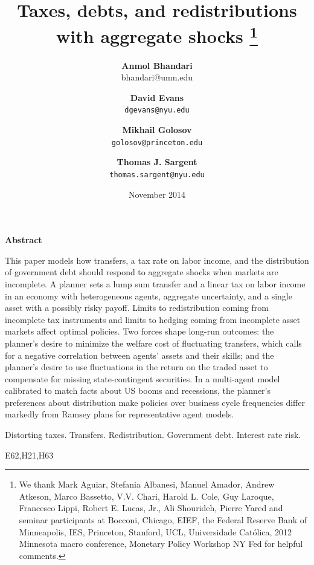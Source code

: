 \documentclass[thmsb,11pt]{article}
\begin{document}
\author{\textbf{Anmol Bhandari}\\bhandari@umn.edu \and \textbf{David Evans} \\ \texttt{dgevans@nyu.edu} \and \textbf{Mikhail Golosov}\\\texttt{golosov@princeton.edu} \and \textbf{Thomas J. Sargent} \\ \texttt{thomas.sargent@nyu.edu}
}
\title{\textbf{Taxes, debts,  and redistributions with aggregate shocks%
\thanks{%
We thank Mark Aguiar, Stefania Albanesi, Manuel Amador,  Andrew Atkeson, Marco Bassetto, V.V. Chari, Harold
L. Cole, Guy Laroque, Francesco Lippi, Robert E. Lucas, Jr., Ali Shourideh, Pierre Yared and seminar
participants at Bocconi, Chicago, EIEF, the Federal Reserve Bank of
Minneapolis, IES, Princeton, Stanford, UCL, Universidade Cat\'{o}lica, 2012
Minnesota macro conference, Monetary Policy Workshop NY Fed for helpful
comments.}}}
\date{November 2014}
\maketitle
\begin{center}
\textbf{Abstract}
\end{center}

This paper models how transfers, a tax rate on labor income, and  the distribution of government debt should
respond to aggregate shocks when markets are incomplete. A planner sets a lump sum transfer and a linear tax on labor income
in an economy with heterogeneous agents, aggregate uncertainty, and a single asset with a possibly risky payoff. Limits to redistribution coming from incomplete  tax instruments and limits to hedging coming from incomplete  asset markets affect optimal policies.
Two forces shape long-run outcomes: the planner's desire to minimize the welfare cost of fluctuating transfers, which calls for a negative correlation between
agents' assets and their skills; and the planner's desire to use fluctuations in
the return on the traded asset to compensate for missing state-contingent securities.  In a multi-agent model calibrated to match facts about  US booms and recessions,
the planner's preferences about distribution  make  policies over business cycle frequencies  differ markedly from
Ramsey plans for representative agent  models.

\medskip


\bigskip
{}Distorting taxes. Transfers. Redistribution.  Government debt.  Interest rate risk.

 E62,H21,H63
\thispagestyle{empty}\bigskip
\end{document}
